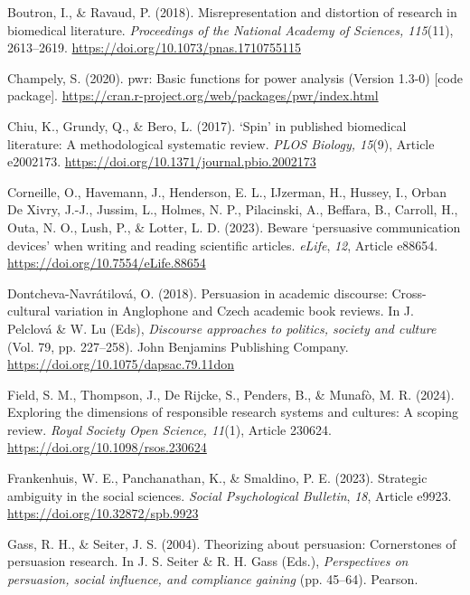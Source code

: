 \documentclass[authordate, meta]{jote-new-article}
\begin{document}
	Boutron, I., \& Ravaud, P. (2018). Misrepresentation and distortion of research in biomedical literature. \emph{Proceedings of the National Academy of Sciences, 115}(11), 2613--2619. \url{https://doi.org/10.1073/pnas.1710755115}



	Champely, S. (2020). pwr: Basic functions for power analysis (Version 1.3-0) [code package]. \url{https://cran.r-project.org/web/packages/pwr/index.html}



	Chiu, K., Grundy, Q., \& Bero, L. (2017). ‘Spin' in published biomedical literature: A methodological systematic review. \emph{PLOS Biology, 15}(9), Article e2002173. \url{https://doi.org/10.1371/journal.pbio.2002173}



	Corneille, O., Havemann, J., Henderson, E. L., IJzerman, H., Hussey, I., Orban De Xivry, J.-J., Jussim, L., Holmes, N. P., Pilacinski, A., Beffara, B., Carroll, H., Outa, N. O., Lush, P., \& Lotter, L. D. (2023). Beware ‘persuasive communication devices' when writing and reading scientific articles. \emph{eLife}, \emph{12}, Article e88654. \url{https://doi.org/10.7554/eLife.88654}



	Dontcheva-Navrátilová, O. (2018). Persuasion in academic discourse: Cross-cultural variation in Anglophone and Czech academic book reviews. In J. Pelclová \& W. Lu (Eds), \emph{Discourse approaches to politics, society and culture} (Vol. 79, pp. 227--258). John Benjamins Publishing Company. \url{https://doi.org/10.1075/dapsac.79.11don}



	Field, S. M., Thompson, J., De Rijcke, S., Penders, B., \& Munafò, M. R. (2024). Exploring the dimensions of responsible research systems and cultures: A scoping review. \emph{Royal Society Open Science, 11}(1), Article 230624. \url{https://doi.org/10.1098/rsos.230624}



	Frankenhuis, W. E., Panchanathan, K., \& Smaldino, P. E. (2023). Strategic ambiguity in the social sciences. \emph{Social Psychological Bulletin}, \emph{18}, Article e9923. \url{https://doi.org/10.32872/spb.9923}



	Gass, R. H., \& Seiter, J. S. (2004). Theorizing about persuasion: Cornerstones of persuasion research. In J. S. Seiter \& R. H. Gass (Eds.), \emph{Perspectives on persuasion, social influence, and compliance gaining} (pp. 45--64). Pearson.
\end{document}
